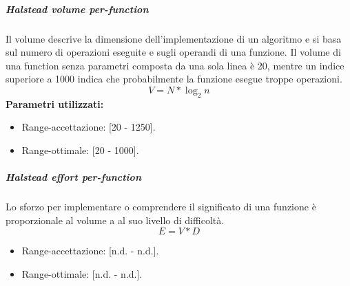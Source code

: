 			\subparagraph{Halstead volume per-function}
			Il volume descrive la dimensione dell'implementazione di un algoritmo e si basa sul numero di operazioni eseguite e sugli operandi di una funzione. Il volume di una function senza parametri composta da una sola linea è 20, mentre un indice superiore a 1000 indica che probabilmente la funzione esegue troppe operazioni.
			\[
			 V = N * \log_{2}n
			\]
			\textbf{Parametri utilizzati:}
			\begin{itemize}
				\item Range-accettazione: [20 - 1250].
				\item Range-ottimale: [20 - 1000].
			\end{itemize}
			
			\subparagraph{Halstead effort per-function}
			Lo sforzo per implementare o comprendere il significato di una funzione è proporzionale al volume a al suo livello di difficoltà.
			 \[
			 E = V * D
			\]
			 \begin{itemize}
				\item Range-accettazione: [n.d. - n.d.].
				\item Range-ottimale: [n.d. - n.d.].
			\end{itemize}
			
			
			
			

